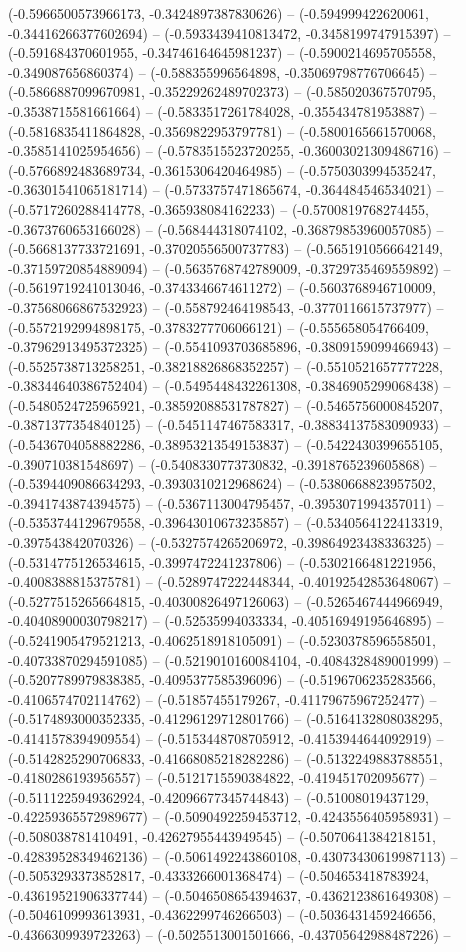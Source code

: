 (-0.5966500573966173, -0.3424897387830626) -- (-0.594999422620061, -0.34416266377602694) -- (-0.5933439410813472, -0.3458199747915397) -- (-0.591684370601955, -0.34746164645981237) -- (-0.5900214695705558, -0.349087656860374) -- (-0.588355996564898, -0.35069798776706645) -- (-0.5866887099670981, -0.35229262489702373) -- (-0.585020367570795, -0.3538715581661664) -- (-0.5833517261784028, -0.355434781953887) -- (-0.5816835411864828, -0.3569822953797781) -- (-0.5800165661570068, -0.3585141025954656) -- (-0.5783515523720255, -0.36003021309486716) -- (-0.5766892483689734, -0.3615306420464985) -- (-0.5750303994535247, -0.36301541065181714) -- (-0.5733757471865674, -0.364484546534021) -- (-0.5717260288414778, -0.365938084162233) -- (-0.5700819768274455, -0.3673760653166028) -- (-0.568444318074102, -0.36879853960057085) -- (-0.5668137733721691, -0.37020556500737783) -- (-0.5651910566642149, -0.37159720854889094) -- (-0.5635768742789009, -0.3729735469559892) -- (-0.5619719241013046, -0.3743346674611272) -- (-0.5603768946710009, -0.37568066867532923) -- (-0.558792464198543, -0.3770116615737977) -- (-0.5572192994898175, -0.3783277706066121) -- (-0.555658054766409, -0.37962913495372325) -- (-0.5541093703685896, -0.3809159099466943) -- (-0.5525738713258251, -0.38218826868352257) -- (-0.5510521657777228, -0.38344640386752404) -- (-0.5495448432261308, -0.3846905299068438) -- (-0.5480524725965921, -0.38592088531787827) -- (-0.5465756000845207, -0.3871377354840125) -- (-0.5451147467583317, -0.38834137583090933) -- (-0.5436704058882286, -0.38953213549153837) -- (-0.5422430399655105, -0.390710381548697) -- (-0.5408330773730832, -0.3918765239605868) -- (-0.5394409086634293, -0.3930310212968624) -- (-0.5380668823957502, -0.3941743874394575) -- (-0.5367113004795457, -0.3953071994357011) -- (-0.5353744129679558, -0.39643010673235857) -- (-0.5340564122413319, -0.397543842070326) -- (-0.5327574265206972, -0.39864923438336325) -- (-0.5314775126534615, -0.3997472241237806) -- (-0.5302166481221956, -0.4008388815375781) -- (-0.5289747222448344, -0.40192542853648067) -- (-0.5277515265664815, -0.40300826497126063) -- (-0.5265467444966949, -0.40408900030798217) -- (-0.52535994033334, -0.40516949195646895) -- (-0.5241905479521213, -0.4062518918105091) -- (-0.5230378596558501, -0.40733870294591085) -- (-0.5219010160084104, -0.4084328489001999) -- (-0.5207789979838385, -0.4095377585396096) -- (-0.5196706235283566, -0.4106574702114762) -- (-0.51857455179267, -0.41179675967252477) -- (-0.5174893000352335, -0.41296129712801766) -- (-0.5164132808038295, -0.4141578394909554) -- (-0.5153448708705912, -0.4153944644092919) -- (-0.5142825290706833, -0.41668085218282286) -- (-0.5132249883788551, -0.4180286193956557) -- (-0.5121715590384822, -0.419451702095677) -- (-0.5111225949362924, -0.42096677345744843) -- (-0.51008019437129, -0.42259365572989677) -- (-0.5090492259453712, -0.4243556405958931) -- (-0.508038781410491, -0.42627955443949545) -- (-0.5070641384218151, -0.42839528349462136) -- (-0.5061492243860108, -0.43073430619987113) -- (-0.5053293373852817, -0.4333266001368474) -- (-0.504653418783924, -0.43619521906337744) -- (-0.5046508654394637, -0.4362123861649308) -- (-0.5046109993613931, -0.4362299746266503) -- (-0.5036431459246656, -0.4366309939723263) -- (-0.5025513001501666, -0.43705642988487226) -- 